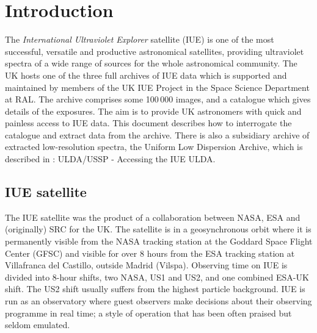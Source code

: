 \documentclass[11pt,twoside,nolof,noabs]{starlink}
\begin{document}
\scfrontmatter

\section {Introduction}

The \textit{International Ultraviolet Explorer\/} satellite (IUE) is one of the
most successful, versatile and productive astronomical satellites, providing
ultraviolet spectra of a wide range of sources for the whole astronomical
community.
The UK hosts one of the three full archives of IUE data
which is supported and maintained by members of the UK IUE
Project in the Space Science Department at RAL.
The archive comprises some 100\,000 images,
and a catalogue which gives details of the exposures.
The aim is to provide UK astronomers with quick and painless
access to IUE data.
This document describes how to interrogate the catalogue and extract data from
the archive.
There is also a subsidiary archive of extracted low-resolution spectra, the
Uniform Low Dispersion Archive,
which is described in
: ULDA/USSP - Accessing the IUE ULDA.

\subsection {IUE satellite}
The IUE satellite was the product
of a collaboration between NASA, ESA and (originally) SRC for the UK.
The satellite is in a geosynchronous orbit where it is permanently visible from
the NASA tracking station at the Goddard Space Flight Center (GFSC) and visible
for over 8 hours from the ESA tracking station at Villafranca del Castillo,
outside Madrid (Vilspa).
Observing time on IUE is divided into 8-hour shifts, two NASA, US1
and US2, and one combined ESA-UK shift.
The US2 shift usually suffers from the highest particle background.
IUE is run as an observatory where guest observers make decisions
about their observing programme in real time; a style of operation
that has been often praised but seldom emulated.
\end{document}
